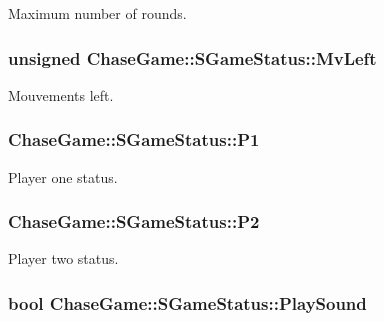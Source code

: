 Maximum number of rounds. 

\hypertarget{struct_chase_game_1_1_s_game_status_ae06758bdc7c2bda68801afd314837532}{
\subsubsection[{Mv\-Left}]{\setlength{\rightskip}{0pt plus 5cm}unsigned Chase\-Game\-::\-S\-Game\-Status\-::\-Mv\-Left}}\label{struct_chase_game_1_1_s_game_status_ae06758bdc7c2bda68801afd314837532}


Mouvements left. 

\hypertarget{struct_chase_game_1_1_s_game_status_ae939192c0ce625f9cbec50549ec88fac}{
\subsubsection[{P1}]{ Chase\-Game\-::\-S\-Game\-Status\-::\-P1}}\label{struct_chase_game_1_1_s_game_status_ae939192c0ce625f9cbec50549ec88fac}


Player one status. 

\hypertarget{struct_chase_game_1_1_s_game_status_a21840b6b133cd5a73d5c0cd3b01116e2}{
\subsubsection[{P2}]{ Chase\-Game\-::\-S\-Game\-Status\-::\-P2}}\label{struct_chase_game_1_1_s_game_status_a21840b6b133cd5a73d5c0cd3b01116e2}


Player two status. 

\hypertarget{struct_chase_game_1_1_s_game_status_a62533ff3db4ae14aa98fc94f4105923f}{
\subsubsection[{Play\-Sound}]{\setlength{\rightskip}{0pt plus 5cm}bool Chase\-Game\-::\-S\-Game\-Status\-::\-Play\-Sound}}\label{struct_chase_game_1_1_s_game_status_a62533ff3db4ae14aa98fc94f4105923f}


